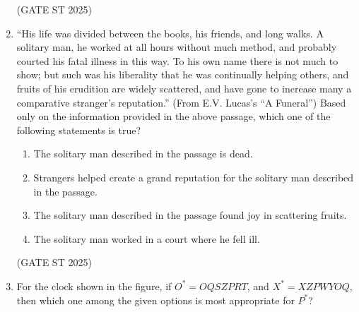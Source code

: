 \documentclass[journal,12pt,onecolumn]{IEEEtran}
\theoremstyle{remark}
\begin{document}
\begin{enumerate}
\begin{enumerate}
\end{enumerate}
\hfill{(GATE ST 2025)}
\newpage
\item ``His life was divided between the books, his friends, and long walks. A solitary man, he worked at all hours without much method, and probably courted his fatal illness in this way. To his own name there is not much to show; but such was his liberality that he was continually helping others, and fruits of his erudition are widely scattered, and have gone to increase many a comparative stranger's reputation.''
(From E.V. Lucas's ``A Funeral'')
Based only on the information provided in the above passage, which one of the following statements is true?
\begin{enumerate}
\item The solitary man described in the passage is dead.
\item Strangers helped create a grand reputation for the solitary man described in the passage.
\item The solitary man described in the passage found joy in scattering fruits.
\item The solitary man worked in a court where he fell ill.
\end{enumerate}
\hfill{(GATE ST 2025)}
\newpage
\item For the clock shown in the figure, if $O^* = OQSZPRT$, and $X^* = XZPWYOQ$, then which one among the given options is most appropriate for $P^*$?


\end{enumerate}
\end{document}
